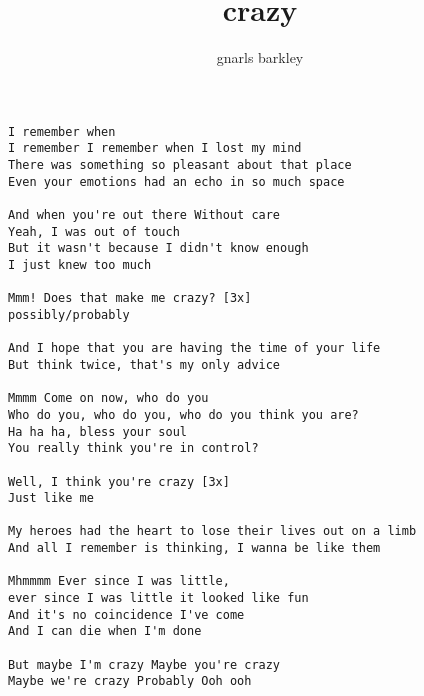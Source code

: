 \author{gnarls barkley}
\title{crazy}
\maketitle
\begin{verbatim}
I remember when
I remember I remember when I lost my mind
There was something so pleasant about that place
Even your emotions had an echo in so much space

And when you're out there Without care
Yeah, I was out of touch
But it wasn't because I didn't know enough
I just knew too much

Mmm! Does that make me crazy? [3x]
possibly/probably

And I hope that you are having the time of your life
But think twice, that's my only advice

Mmmm Come on now, who do you
Who do you, who do you, who do you think you are?
Ha ha ha, bless your soul
You really think you're in control?

Well, I think you're crazy [3x]
Just like me

My heroes had the heart to lose their lives out on a limb
And all I remember is thinking, I wanna be like them

Mhmmmm Ever since I was little,
ever since I was little it looked like fun
And it's no coincidence I've come
And I can die when I'm done

But maybe I'm crazy Maybe you're crazy
Maybe we're crazy Probably Ooh ooh
\end{verbatim}